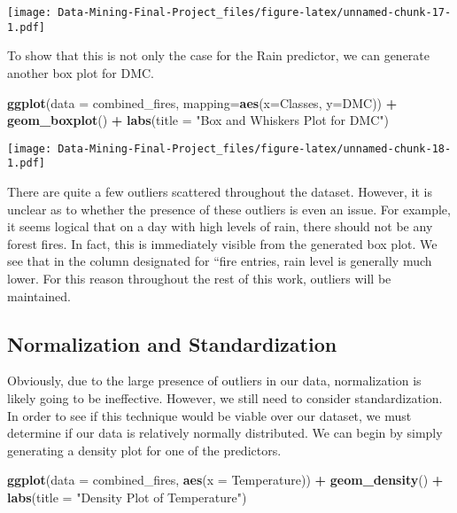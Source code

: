 \documentclass[
]{article}
\newenvironment{Shaded}{\begin{snugshade}}{\end{snugshade}}
\newcommand{\AttributeTok}[1]{\textcolor[rgb]{0.13,0.29,0.53}{#1}}
\newcommand{\FunctionTok}[1]{\textcolor[rgb]{0.13,0.29,0.53}{\textbf{#1}}}
\newcommand{\NormalTok}[1]{#1}
\newcommand{\SpecialCharTok}[1]{\textcolor[rgb]{0.81,0.36,0.00}{\textbf{#1}}}
\newcommand{\StringTok}[1]{\textcolor[rgb]{0.31,0.60,0.02}{#1}}
\begin{document}
\texttt{[image: Data-Mining-Final-Project\_files/figure-latex/unnamed-chunk-17-1.pdf]}

To show that this is not only the case for the Rain predictor, we can
generate another box plot for DMC.

\begin{Shaded}
\begin{Highlighting}[]
\FunctionTok{ggplot}\NormalTok{(}\AttributeTok{data =}\NormalTok{ combined\_fires, }\AttributeTok{mapping=}\FunctionTok{aes}\NormalTok{(}\AttributeTok{x=}\NormalTok{Classes, }\AttributeTok{y=}\NormalTok{DMC)) }\SpecialCharTok{+}
  \FunctionTok{geom\_boxplot}\NormalTok{() }\SpecialCharTok{+}
  \FunctionTok{labs}\NormalTok{(}\AttributeTok{title =} \StringTok{"Box and Whiskers Plot for DMC"}\NormalTok{)}
\end{Highlighting}
\end{Shaded}

\texttt{[image: Data-Mining-Final-Project\_files/figure-latex/unnamed-chunk-18-1.pdf]}

There are quite a few outliers scattered throughout the dataset.
However, it is unclear as to whether the presence of these outliers is
even an issue. For example, it seems logical that on a day with high
levels of rain, there should not be any forest fires. In fact, this is
immediately visible from the generated box plot. We see that in the
column designated for ``fire entries, rain level is generally much
lower. For this reason throughout the rest of this work, outliers will
be maintained.

\subsection{Normalization and
Standardization}\label{normalization-and-standardization}

Obviously, due to the large presence of outliers in our data,
normalization is likely going to be ineffective. However, we still need
to consider standardization. In order to see if this technique would be
viable over our dataset, we must determine if our data is relatively
normally distributed. We can begin by simply generating a density plot
for one of the predictors.

\begin{Shaded}
\begin{Highlighting}[]
\FunctionTok{ggplot}\NormalTok{(}\AttributeTok{data =}\NormalTok{ combined\_fires, }\FunctionTok{aes}\NormalTok{(}\AttributeTok{x =}\NormalTok{ Temperature)) }\SpecialCharTok{+} 
  \FunctionTok{geom\_density}\NormalTok{() }\SpecialCharTok{+} 
  \FunctionTok{labs}\NormalTok{(}\AttributeTok{title =} \StringTok{"Density Plot of Temperature"}\NormalTok{)}
\end{Highlighting}
\end{Shaded}
\end{document}

